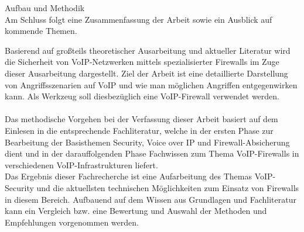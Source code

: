 \begin{section}{Aufbau und Methodik}
\DIFdelend \DIFaddbegin \\
\DIFaddend Am Schluss folgt eine Zusammenfassung der Arbeit sowie ein Ausblick auf kommende Themen.
\DIFdelbegin %
\DIFdelend \pagebreak


\DIFdelbegin %
\DIFdelend Basierend auf großteils theoretischer Ausarbeitung und aktueller Literatur wird die Sicherheit von VoIP-Netzwerken mittels spezialisierter Firewalls im Zuge dieser Ausarbeitung dargestellt.
Ziel der Arbeit ist eine detaillierte Darstellung von Angriffsszenarien auf VoIP und wie man möglichen Angriffen entgegenwirken kann. Als Werkzeug soll diesbezüglich eine VoIP-Firewall verwendet werden. 
\\ \DIFdelbegin {}\DIFdelend \\
Das methodische Vorgehen bei der Verfassung dieser Arbeit basiert auf dem Einlesen in die entsprechende Fachliteratur, welche in der ersten Phase zur Bearbeitung der Basisthemen Security, Voice over IP und Firewall-Absicherung dient und in der darauffolgenden Phase Fachwissen zum Thema VoIP-Firewalls in verschiedenen VoIP-Infrastrukturen liefert.
\\
Das Ergebnis dieser Fachrecherche ist eine Aufarbeitung des Themas VoIP-Security und die aktuellsten technischen Möglichkeiten zum Einsatz von Firewalls in diesem Bereich. 
Aufbauend auf dem Wissen aus Grundlagen und Fachliteratur kann ein Vergleich bzw. eine Bewertung und Auswahl der Methoden und Empfehlungen vorgenommen werden. 
\end{section}
\pagebreak

